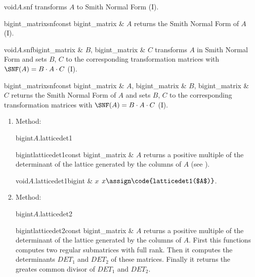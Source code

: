 {\begin{fcode}{void}{$A$.snf}{}
  transforms $A$ to Smith Normal Form (I).
\end{fcode}

\begin{fcode}{bigint_matrix}{snf}{const bigint_matrix & $A$}
  returns the Smith Normal Form of $A$(I).
\end{fcode}

\begin{fcode}{void}{$A$.snf}{bigint_matrix & $B$, bigint_matrix & $C$}
  transforms $A$ in Smith Normal Form and sets $B$, $C$ to the corresponding transformation
  matrices with $\SNF(A) = B \cdot A \cdot C$ (I).
\end{fcode}

\begin{fcode}{bigint_matrix}{snf}{const bigint_matrix & $A$, bigint_matrix & $B$, bigint_matrix & $C$}
  returns the Smith Normal Form of $A$ and sets $B$, $C$ to the corresponding transformation
  matrices with $\SNF(A) = B \cdot A \cdot C$ (I).
\end{fcode}







\begin{enumerate}
\item Method:

  \begin{cfcode}{bigint}{$A$.latticedet1}{}
  \end{cfcode}
  \begin{fcode}{bigint}{latticedet1}{const bigint_matrix & $A$}
    returns a positive multiple of the determinant of the lattice generated by the columns of $A$
    (see \cite{Duellmann_Thesis:1991}).
  \end{fcode}
  
  \begin{cfcode}{void}{$A$.latticedet1}{bigint & $x$}
    $x \assign \code{latticedet1($A$)}$.
  \end{cfcode}

\item Method:

  \begin{cfcode}{bigint}{$A$.latticedet2}{}
  \end{cfcode}
  \begin{fcode}{bigint}{latticedet2}{const bigint_matrix & $A$}
    returns a positive multiple of the determinant of the lattice generated by the columns of
    $A$.  First this functions computes two regular submatrices with full rank.  Then it
    computes the determinants $\mathit{DET}_1$ and $\mathit{DET}_2$ of these matrices.  Finally
    it returns the greates common divisor of $\mathit{DET}_1$ and $\mathit{DET}_2$.
  \end{fcode}


\end{enumerate}}
